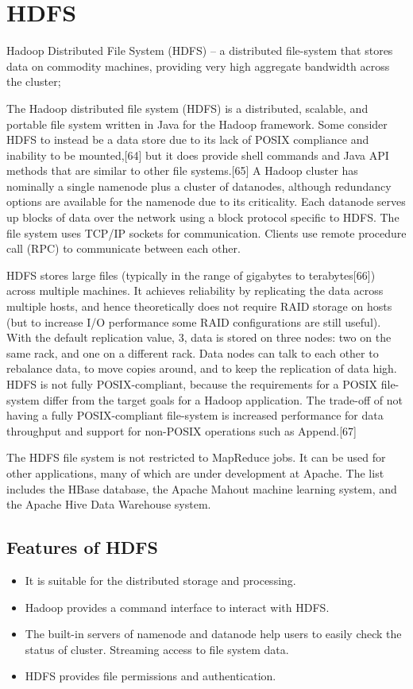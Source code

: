 \section{HDFS}
Hadoop Distributed File System (HDFS) – a distributed file-system that stores data on commodity machines, providing very high aggregate bandwidth across the cluster;

The Hadoop distributed file system (HDFS) is a distributed, scalable, and portable file system written in Java for the Hadoop framework. Some consider HDFS to instead be a data store due to its lack of POSIX compliance and inability to be mounted,[64] but it does provide shell commands and Java API methods that are similar to other file systems.[65] A Hadoop cluster has nominally a single namenode plus a cluster of datanodes, although redundancy options are available for the namenode due to its criticality. Each datanode serves up blocks of data over the network using a block protocol specific to HDFS. The file system uses TCP/IP sockets for communication. Clients use remote procedure call (RPC) to communicate between each other.

HDFS stores large files (typically in the range of gigabytes to terabytes[66]) across multiple machines. It achieves reliability by replicating the data across multiple hosts, and hence theoretically does not require RAID storage on hosts (but to increase I/O performance some RAID configurations are still useful). With the default replication value, 3, data is stored on three nodes: two on the same rack, and one on a different rack. Data nodes can talk to each other to rebalance data, to move copies around, and to keep the replication of data high. HDFS is not fully POSIX-compliant, because the requirements for a POSIX file-system differ from the target goals for a Hadoop application. The trade-off of not having a fully POSIX-compliant file-system is increased performance for data throughput and support for non-POSIX operations such as Append.[67]

The HDFS file system is not restricted to MapReduce jobs. It can be used for other applications, many of which are under development at Apache. The list includes the HBase database, the Apache Mahout machine learning system, and the Apache Hive Data Warehouse system. 


\subsection{Features of HDFS}
\begin{itemize}
\item It is suitable for the distributed storage and processing.
\item Hadoop provides a command interface to interact with HDFS.
\item The built-in servers of namenode and datanode help users to easily check the status of cluster.
Streaming access to file system data.
\item HDFS provides file permissions and authentication.
\end{itemize}

